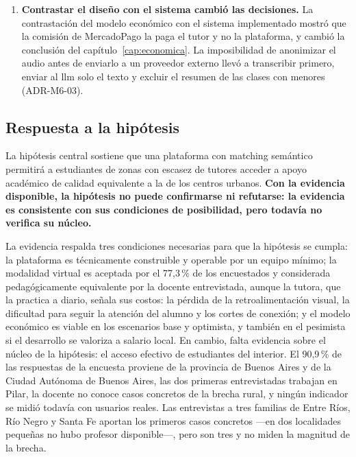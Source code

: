 \begin{enumerate}
           y sigue siendo positivo
          (sección~\ref{sec:costo-fundador}).
    \item \textbf{Contrastar el diseño con el sistema cambió las
          decisiones.} La contrastación del modelo económico con el
          sistema implementado mostró que la comisión de MercadoPago la
          paga el tutor y no la plataforma, y cambió la conclusión del
          capítulo~\ref{cap:economica}. La imposibilidad de anonimizar el
          audio antes de enviarlo a un proveedor externo llevó a
          transcribir primero, enviar al \gls{llm} solo el texto y excluir
          el resumen de las clases con menores (ADR-M6-03).
\end{enumerate}

\subsection{Respuesta a la hipótesis}\label{sec:respuesta-hipotesis}

La hipótesis central sostiene que una plataforma con \gls{matching}
semántico permitirá a estudiantes de zonas con escasez de tutores
acceder a apoyo académico de calidad equivalente a la de los centros
urbanos. \textbf{Con la evidencia disponible, la hipótesis no puede
confirmarse ni refutarse: la evidencia es consistente con sus
condiciones de posibilidad, pero todavía no verifica su núcleo.}

La evidencia respalda tres condiciones necesarias para que la hipótesis
se cumpla: la plataforma es técnicamente construible y operable por un
equipo mínimo; la modalidad virtual es aceptada por el 77,3\,\% de los
encuestados y considerada pedagógicamente equivalente por la docente
entrevistada, aunque la tutora, que la practica a diario, señala sus
costos: la pérdida de la retroalimentación visual, la dificultad para
seguir la atención del alumno y los cortes de conexión; y el modelo económico es viable en los escenarios base y
optimista, y también en el pesimista si el desarrollo se valoriza a
salario local. En cambio, falta evidencia sobre el núcleo de la hipótesis: el
acceso efectivo de estudiantes del interior. El 90,9\,\% de las
respuestas de la encuesta proviene de la provincia de Buenos Aires y de
la Ciudad Autónoma de Buenos Aires, las dos primeras entrevistadas trabajan en
Pilar, la docente no conoce casos concretos de la brecha rural, y ningún
indicador se midió todavía con usuarios reales. Las entrevistas a tres
familias de Entre Ríos, Río Negro y Santa Fe aportan los primeros casos
concretos ---en dos localidades pequeñas no hubo profesor disponible---,
pero son tres y no miden la magnitud de la brecha.

